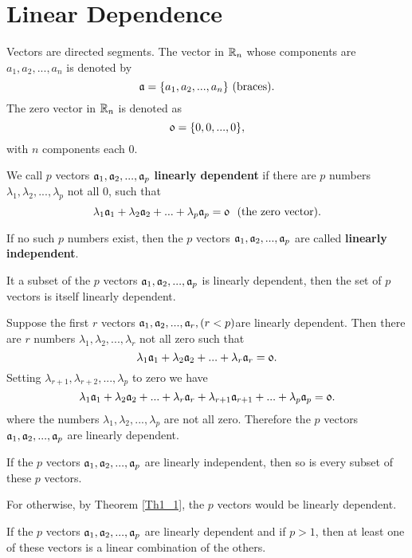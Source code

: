 \section{Linear Dependence}
\begin{definition}
Vectors are directed segments. The vector in $\mathbb{R}_n$ whose components are $a_1, a_2,...,a_n$ is denoted by $$\mathfrak{a} = \{a_1, a_2, ..., a_n\}\hbox{~(braces)}.$$
The zero vector in $\mathbb{R}_n$ is denoted as $$\mathfrak{0} = \{0,0,...,0\},$$ with $n$ components each 0. 
\end{definition}

\begin{definition}We call $p$ vectors $\mathfrak{a}_1, \mathfrak{a}_2, ..., \mathfrak{a}_p$ {\bf linearly dependent} if there are $p$ numbers $\lambda_1, \lambda_2,...,\lambda_p$ not all $0$, such that 
$$\lambda_1 \mathfrak{a}_1 + \lambda_2 \mathfrak{a}_2 +...+ \lambda_p \mathfrak{a}_p = \mathfrak{0}\hbox{~ (the zero vector)}.$$
\end{definition}

If no such $p$ numbers exist, then the $p$ vectors $\mathfrak{a}_1, \mathfrak{a}_2, ...,\mathfrak{a}_p$ are called {\bf linearly independent}.

\begin{theorem} 
It a subset of the $p$ vectors $\mathfrak{a}_1, \mathfrak{a}_2,...,\mathfrak{a}_p$ is linearly dependent, then the set of $p$ vectors is itself linearly dependent.\label{Th1_1}
\end{theorem}

Suppose the first $r$ vectors $\mathfrak{a}_1, \mathfrak{a}_2, ..., \mathfrak{a}_r, (r < p) $are linearly dependent. Then there are $r$ numbers $\lambda_1, \lambda_2, ..., \lambda_r$ not all zero such that 
$$\lambda_1 \mathfrak{a}_1 + \lambda_2 \mathfrak{a}_2 + ... + \lambda_r \mathfrak{a}_r = \mathfrak{0}.$$ Setting $\lambda_{r+1}, \lambda_{r+2}, ..., \lambda_p$ to zero we have
$$\lambda_1 \mathfrak{a}_1 + \lambda_2 \mathfrak{a}_2 + ... + \lambda_r \mathfrak{a}_r + \lambda_{r+1}\mathfrak{a}_{r+1} +... + \lambda_p \mathfrak{a}_p = \mathfrak{0}.$$ where the numbers $\lambda_1, \lambda_2, ..., \lambda_p$ are not all zero. Therefore the 
$p$ vectors $\mathfrak{a}_1, \mathfrak{a}_2, ..., \mathfrak{a}_p$ are linearly dependent. 

\begin{theorem}
If the $p$ vectors $\mathfrak{a}_1, \mathfrak{a}_2, ..., \mathfrak{a}_p$ are linearly independent, then so is every subset of these $p$ vectors. \label{Th1_2}
\end{theorem}

For otherwise, by Theorem \ref{Th1_1}, the $p$ vectors would be linearly dependent.

\begin{theorem}
If the $p$ vectors $\mathfrak{a}_1, \mathfrak{a}_2, ..., \mathfrak{a}_p$ are linearly dependent and if $p>1$, then at least one of these vectors
is a linear combination of the others.\label{Th1_3}
\end{theorem}

